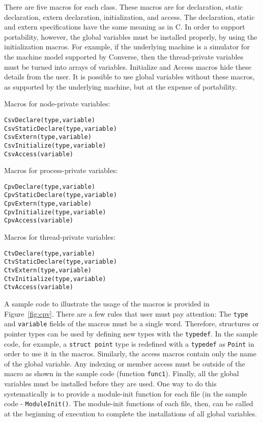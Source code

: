 There are five macros for each class. These macros are for
declaration, static declaration, extern declaration, initialization, and
access. The declaration, static and extern specifications have the same
meaning as in C. In order to support portability, however, the global
variables must be installed properly, by using the initialization macros.
For example, if the underlying machine is a simulator for the machine model 
supported by Converse, then the thread-private variables must be turned into 
arrays of variables.  Initialize and Access macros hide these details from 
the user.  It is possible to use global variables without these macros, 
as supported by the underlying machine, but at the expense of portability.


Macros for node-private variables:
\begin{verbatim}
CsvDeclare(type,variable)
CsvStaticDeclare(type,variable)
CsvExtern(type,variable)
CsvInitialize(type,variable)
CsvAccess(variable)
\end{verbatim}


Macros for process-private variables:
\begin{verbatim}
CpvDeclare(type,variable)
CpvStaticDeclare(type,variable)
CpvExtern(type,variable)
CpvInitialize(type,variable)
CpvAccess(variable)
\end{verbatim}

Macros for thread-private variables:
\begin{verbatim}
CtvDeclare(type,variable)
CtvStaticDeclare(type,variable)
CtvExtern(type,variable)
CtvInitialize(type,variable)
CtvAccess(variable)
\end{verbatim}


    A sample code to illustrate the usage of the macros is provided
    in Figure~\ref{fig:cpv}.
    There are a few rules that user must pay attention: The
    {\tt type} and {\tt variable} fields of the macros must be a single
    word. Therefore, structures or pointer types can be used by defining
    new types with the {\tt typedef}. In the sample code, for example,
    a {\tt struct point} type is redefined with a {\tt typedef} as {\tt Point}
    in order to use it in the macros. Similarly,  the access macros contain
    only the name of the global variable. Any indexing or member access
    must be outside of the macro as shown in the sample code 
    (function {\tt func1}). Finally, all the global variables must be
    installed before they are used. One way to do this systematically is
    to provide a module-init function for each file (in the sample code - 
    {\tt ModuleInit()}. The module-init functions of each file, then, can be 
    called at the beginning of execution to complete the installations of 
    all global variables.
    
